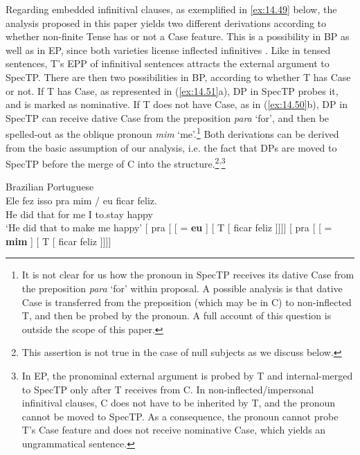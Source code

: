\documentclass[output=paper]{langsci/langscibook}
\begin{document}
Regarding embedded infinitival clauses, as exemplified in \eqref{ex:14.49}
below, the analysis proposed in this paper yields two different derivations
according to whether non-finite Tense has or not a Case feature. This is a
possibility in \gls{BP} as well as in EP, since both
varieties license inflected infinitives \parencite{Raposo1987,Modesto2016}.
Like in tensed sentences, T’s \gls{EPP} of infinitival sentences attracts the
external argument to SpecTP. There are then two possibilities in BP, according
to whether T has Case or not. If T has Case, as represented in
(\ref{ex:14.51}a), DP in SpecTP probes it, and is marked as nominative. If
T does not have Case, as in (\ref{ex:14.50}b), DP in SpecTP can receive
dative Case from the preposition \emph{para} ‘for’, and then be spelled-out as
the oblique pronoun \emph{mim} ‘me’.\footnote{It is not clear for us how the
    pronoun in SpecTP receives its dative Case from the preposition \emph{para}
    ‘for’ within  proposal. A possible analysis is that
dative Case is transferred from the preposition (which may be in C) to
non-inflected T, and then be probed by the pronoun. A full account of this
question is outside the scope of this paper.} Both derivations can be derived
from the basic assumption of our analysis, i.e. the fact that DPs are moved to
SpecTP before the merge of C into the structure.\footnote{This assertion is not
    true in the case of null subjects as we discuss
    below.}\textsuperscript{,}\footnote{In \gls{EP},
    the pronominal external argument is probed by T and internal-merged to
    SpecTP only after T receives  from C. In non-inflected/impersonal
    infinitival clauses, C does not have  to be inherited by T, and
the pronoun cannot be moved to SpecTP.  As a consequence, the pronoun cannot
probe T’s Case feature and does not receive nominative Case, which yields an
ungrammatical sentence.}

\ea%
    \label{ex:14.49}Brazilian Portuguese\\
    \gll    Ele fez isso pra mim / eu ficar feliz.\\
            He did that for me {} I to.stay happy\\
    \glt    ‘He did that to make me happy’
\ex%
    \label{ex:14.50}
	\ea
    {}[ pra [ [ \Fsg{} = \textbf{eu} ]
        [ T [ ficar feliz ]]]]
    \ex
    {}[ pra [ [ \Fsg{} = \textbf{mim} ]
        [ T [ ficar feliz ]]]]
    \z
\z
\end{document}
